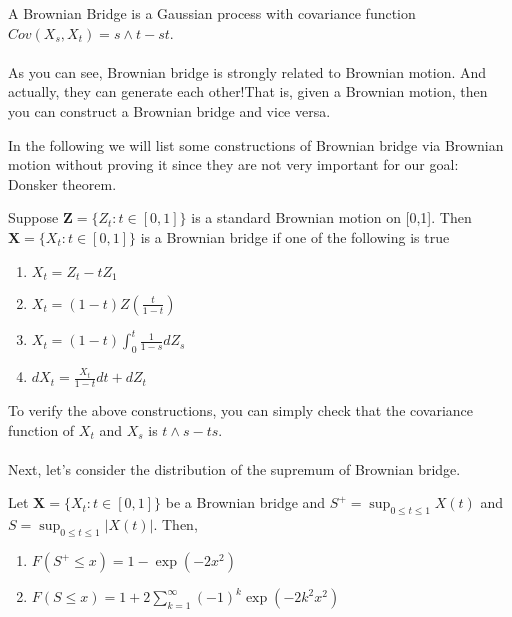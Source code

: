\documentclass[project2.tex]{subfiles}
\begin{document}
\begin{definition}
A Brownian Bridge is a Gaussian process with covariance function	$Cov(X_s,X_t)=s\wedge t-st$.
\end{definition}

\paragraph{}
As you can see, Brownian bridge is strongly related to Brownian motion. And actually, they can generate each other!That is, given a Brownian motion, then you can construct a Brownian bridge and vice versa.

In the following we will list some constructions of Brownian bridge via Brownian motion without proving it since they are not very important for our goal: Donsker theorem. 

\begin{property}
Suppose $\mathbf{Z} = \{Z_t: t\in[0,1]\}$ is a standard Brownian motion on [0,1]. Then $\mathbf{X} = \{X_t:t\in [0,1]\}$ is a Brownian bridge if one of the following is true
\begin{enumerate}
\item $X_t = Z_t-tZ_1$ \\
\item $X_t = (1-t)Z(\frac{t}{1-t})$ \\
\item $X_t = (1-t)\int^t_0 \frac{1}{1-s}dZ_s$ \\
\item $dX_t=\frac{X_t}{1-t}dt + dZ_t$
\end{enumerate}
\end{property}
To verify the above constructions, you can simply check that the covariance function of $X_t$ and $X_s$ is $t\wedge s - ts$.

\paragraph{}
Next, let's consider the distribution of the supremum of Brownian bridge.
\begin{property}
Let $\mathbf{X}=\{X_t:t\in[0,1]\}$ be a Brownian bridge and $S^+ = \sup_{0\leq t\leq 1}X(t)$ and $S = \sup_{0\leq t\leq 1}|X(t)|$. Then,
\begin{enumerate}
\item $F(S^+ \leq x) = 1-\exp(-2x^2)$\\
\item $F(S\leq x) = 1 + 2\sum^{\infty}_{k=1}(-1)^k\exp(-2k^2x^2)$
\end{enumerate}
\end{property}
\end{document}
